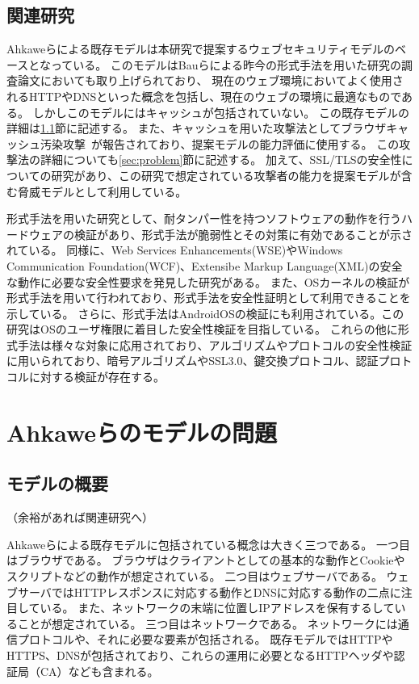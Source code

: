 \documentclass{css}
\begin{document}
\subsection{関連研究}
Ahkaweらによる既存モデル\cite{webmodel}は本研究で提案するウェブセキュリティモデルのベースとなっている。
このモデルはBauらによる昨今の形式手法を用いた研究の調査論文\cite{security_modeling_and_analysis}においても取り上げられており、
現在のウェブ環境においてよく使用されるHTTPやDNSといった概念を包括し、現在のウェブの環境に最適なものである。
しかしこのモデルにはキャッシュが包括されていない。
この既存モデルの詳細は\ref{sec:existingmodel}節に記述する。
また、キャッシュを用いた攻撃法としてブラウザキャッシュ汚染攻撃~\cite{bcpattack}が報告されており、提案モデルの能力評価に使用する。
この攻撃法の詳細についても\ref{sec:problem}節に記述する。
加えて、SSL/TLSの安全性についての研究\cite{securing_frame_communication_in_browsers}があり、この研究で想定されている攻撃者の能力を提案モデルが含む脅威モデルとして利用している。

形式手法を用いた研究として、耐タンパー性を持つソフトウェアの動作を行うハードウェアの検証\cite{specifying_and_verifying_hardware_for}があり、形式手法が脆弱性とその対策に有効であることが示されている。
同様に、Web Services Enhancements(WSE)やWindows Communication Foundation(WCF)、Extensibe Markup Language(XML)の安全な動作に必要な安全性要求を発見した研究\cite{TFFWS27,TFFWS28}がある。
また、OSカーネルの検証\cite{sel4_formal_verification_of_an}が形式手法を用いて行われており、形式手法を安全性証明として利用できることを示している。
さらに、形式手法はAndroidOSの検証\cite{towards_formal_analysis_of_the}にも利用されている。この研究はOSのユーザ権限に着目した安全性検証を目指している。
これらの他に形式手法は様々な対象に応用されており、アルゴリズムやプロトコルの安全性検証に用いられており、暗号アルゴリズムやSSL3.0、鍵交換プロトコル、認証プロトコルに対する検証が存在する\cite{TFFWS17,TFFWS18,TFFWS19,TFFWS20}。

\section{Ahkaweらのモデルの問題}

\subsection{モデルの概要}
\label{sec:existingmodel}
\color{red}
（余裕があれば関連研究へ）
\color{black}

Ahkaweらによる既存モデル\cite{webmodel}に包括されている概念は大きく三つである。
一つ目はブラウザである。
ブラウザはクライアントとしての基本的な動作とCookieやスクリプトなどの動作が想定されている。
二つ目はウェブサーバである。
ウェブサーバではHTTPレスポンスに対応する動作とDNSに対応する動作の二点に注目している。
また、ネットワークの末端に位置しIPアドレスを保有するしていることが想定されている。
三つ目はネットワークである。
ネットワークには通信プロトコルや、それに必要な要素が包括される。
既存モデルではHTTPやHTTPS、DNSが包括されており、これらの運用に必要となるHTTPヘッダや認証局（CA）なども含まれる。
\end{document}
